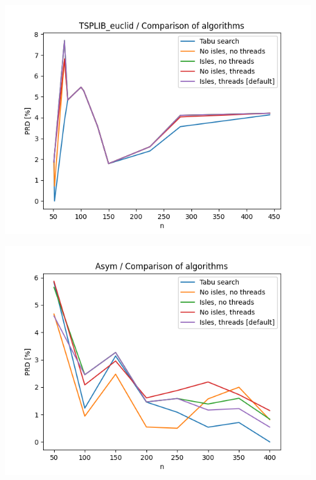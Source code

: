 \documentclass{article}
\begin{document}
\begin{center}
\includegraphics[width=\textwidth, 
                   height = 0.4\textheight, 
                   keepaspectratio]
                  {plots/tsplib_euclid_1_comparison} 
\end{center}

\begin{center}
\includegraphics[width=\textwidth, 
                   height = 0.4\textheight, 
                   keepaspectratio]
                  {plots/asym_1_comparison} 
\end{center}
\end{document}
